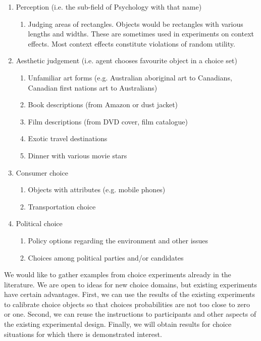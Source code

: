 \documentclass[11pt,letter]{amsart}
\begin{document}
\begin{enumerate}
	\item Perception (i.e. the sub-field of Psychology with that name)
	\begin{enumerate}
		\item Judging areas of rectangles. Objects would be rectangles with various lengths and widths.
		These are sometimes used in experiments on context effects.
		Most context effects constitute violations of random utility.
	\end{enumerate}
	\item Aesthetic judgement (i.e. agent chooses favourite object in a choice set)
	\begin{enumerate}
		\item Unfamiliar art forms
		(e.g. Australian aboriginal art to Canadians, Canadian first nations art to Australians)
		\item Book descriptions (from Amazon or dust jacket)
		\item Film descriptions (from DVD cover, film catalogue)
		\item Exotic travel destinations
		\item Dinner with various movie stars
	\end{enumerate}
	\item Consumer choice
	\begin{enumerate}
		\item Objects with attributes (e.g. mobile phones)
		\item Transportation choice
	\end{enumerate}
	\item Political choice
	\begin{enumerate}
		\item Policy options regarding the environment and other issues
		\item Choices among political parties and/or candidates
	\end{enumerate}
\end{enumerate}

We would like to gather examples from choice experiments already in the literature.
We are open to ideas for new choice domains, but existing experiments have certain advantages.
First, we can use the results of the existing experiments to calibrate choice objects so that choices probabilities are not too close to zero or one.
Second, we can reuse the instructions to participants and other aspects of the existing experimental design.
Finally, we will obtain results for choice situations for which there is demonstrated interest.
\end{document}
